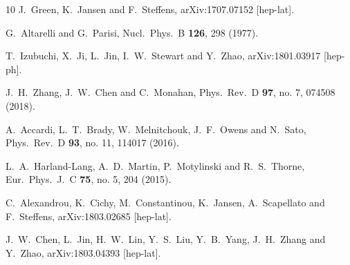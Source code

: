 \begin{thebibliography}{10}
  J.~Green, K.~Jansen and F.~Steffens,
  arXiv:1707.07152 [hep-lat].


  G.~Altarelli and G.~Parisi,
  Nucl.\ Phys.\ B {\bf 126}, 298 (1977).


  T.~Izubuchi, X.~Ji, L.~Jin, I.~W.~Stewart and Y.~Zhao,
  arXiv:1801.03917 [hep-ph].


  J.~H.~Zhang, J.~W.~Chen and C.~Monahan,
  Phys.\ Rev.\ D {\bf 97}, no. 7, 074508 (2018).


  A.~Accardi, L.~T.~Brady, W.~Melnitchouk, J.~F.~Owens and N.~Sato,
  Phys.\ Rev.\ D {\bf 93}, no. 11, 114017 (2016).


  L.~A.~Harland-Lang, A.~D.~Martin, P.~Motylinski and R.~S.~Thorne,
  Eur.\ Phys.\ J.\ C {\bf 75}, no. 5, 204 (2015).


  C.~Alexandrou, K.~Cichy, M.~Constantinou, K.~Jansen, A.~Scapellato and F.~Steffens,
  arXiv:1803.02685 [hep-lat].

  J.~W.~Chen, L.~Jin, H.~W.~Lin, Y.~S.~Liu, Y.~B.~Yang, J.~H.~Zhang and Y.~Zhao,
  arXiv:1803.04393 [hep-lat].

\end{thebibliography}

